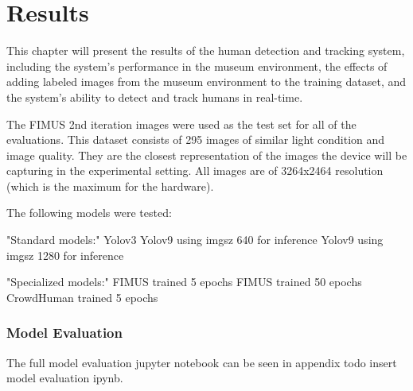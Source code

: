 \section{Results}
\label{sec:results}
This chapter will present the results of the human detection and tracking system, including the system's performance in the museum environment, the effects of adding labeled images from the museum environment to the training dataset, and the system's ability to detect and track humans in real-time.

The FIMUS 2nd iteration images were used as the test set for all of the evaluations. This dataset consists of 295 images of similar light condition and image quality. They are the closest representation of the images the device will be capturing in the experimental setting. All images are of 3264x2464 resolution (which is the maximum for the hardware).

The following models were tested:

"Standard models:"
	Yolov3
	Yolov9 using imgsz 640 for inference
	Yolov9 using imgsz 1280 for inference

"Specialized models:"
	FIMUS trained 5 epochs
	FIMUS trained 50 epochs
	CrowdHuman trained 5 epochs




\subsubsection*{Model Evaluation}
The full model evaluation jupyter notebook can be seen in appendix todo insert model evaluation ipynb.




\label{sec:results_heatmaps}